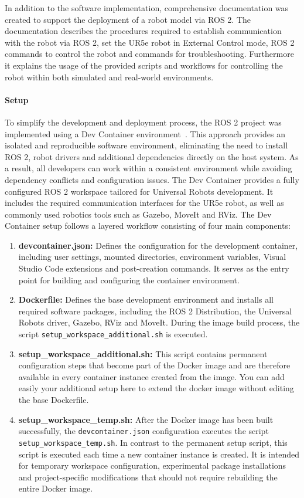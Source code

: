 In addition to the software implementation, comprehensive documentation was created to support the deployment of a robot model via ROS 2. The documentation describes the procedures required to establish communication with the robot via ROS 2, set the UR5e robot in External Control mode, ROS 2 commands to control the robot and commands for troubleshooting. Furthermore it explains the usage of the provided scripts and workflows for controlling the robot within both simulated and real-world environments.


\paragraph{Setup}
To simplify the development and deployment process, the ROS 2 project was implemented using a Dev Container environment~\cite{DevelopingContainer}. This approach provides an isolated and reproducible software environment, eliminating the need to install ROS 2, robot drivers and additional dependencies directly on the host system. As a result, all developers can work within a consistent environment while avoiding dependency conflicts and configuration issues.
The Dev Container provides a fully configured ROS 2 workspace tailored for Universal Robots development. It includes the required communication interfaces for the UR5e robot, as well as commonly used robotics tools such as Gazebo, MoveIt and RViz.
The Dev Container setup follows a layered workflow consisting of four main components:
\begin{enumerate}
    \item \textbf{devcontainer.json:} Defines the configuration for the development container, including user settings, mounted directories, environment variables, Visual Studio Code extensions and post-creation commands. It serves as the entry point for building and configuring the container environment.
    \item \textbf{Dockerfile:} Defines the base development environment and installs all required software packages, including the ROS 2 Distribution, the Universal Robots driver, Gazebo, RViz and MoveIt. 
    During the image build process, the script \texttt{setup\_workspace\_additional.sh} is executed. 
    \item \textbf{setup\_workspace\_additional.sh:} This script contains permanent configuration steps that become part of the Docker image and are therefore available in every container instance created from the image. You can add easily your additional setup here to extend the docker image without editing the base Dockerfile.
    \item \textbf{setup\_workspace\_temp.sh:} After the Docker image has been built successfully, the \texttt{devcontainer.json} configuration executes the script \texttt{setup\_workspace\_temp.sh}. In contrast to the permanent setup script, this script is executed each time a new container instance is created. It is intended for temporary workspace configuration, experimental package installations and project-specific modifications that should not require rebuilding the entire Docker image. 
\end{enumerate}
